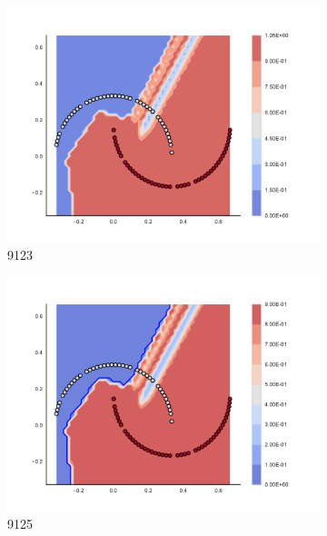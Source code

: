 \begin{figure}[h]
\begin{subfigure}[b]{0.09\textwidth}
    \includegraphics[clip, trim=2.35cm 1.75cm 4.5cm 0cm,width=\textwidth]{img/convergence/9123.pdf}
    \caption{9123}
    \label{fig:convergence_9123}
\end{subfigure}
%
\begin{subfigure}[b]{0.09\textwidth}
    \includegraphics[clip, trim=2.35cm 1.75cm 4.5cm 0cm,width=\textwidth]{img/convergence/9125.pdf}
    \caption{9125}
    \label{fig:convergence_9125}
\end{subfigure}
%
\begin{subfigure}[b]{0.09\textwidth}

\end{subfigure}
\end{figure}
